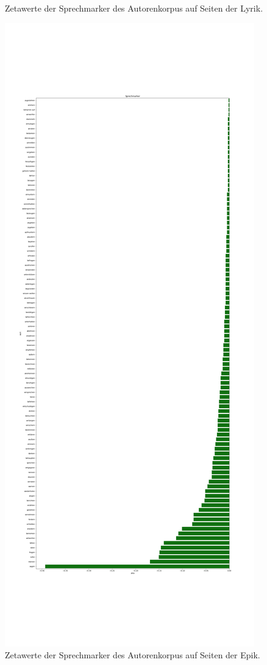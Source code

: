 \documentclass[a4paper,10p]{article}
\begin{document}
\begin{figure}{}
\begin{minipage}[b]{.45\linewidth}
        \caption{Zetawerte der Sprechmarker des Autorenkorpus auf Seiten der Lyrik.}
        \label{autoren_sprechmarker}
    \end{minipage}
    \hfill
    \begin{minipage}[b]{.45\linewidth}
        \centering
        \includegraphics[width=\linewidth]{autoren_sprechmarker_lang_pro_wort2.png}
        \caption{Zetawerte der Sprechmarker des Autorenkorpus auf Seiten der Epik.} 
        \label{autoren_sprechmarker2}
    \end{minipage}
\end{figure}
\end{document}
